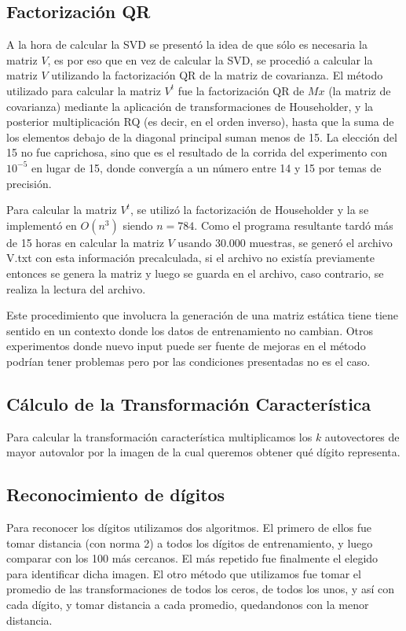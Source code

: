 \subsection{Factorizaci\'on QR}
A la hora de calcular la SVD se present\'o la idea de que s\'olo es necesaria la matriz $V$, es por
eso que en vez de calcular la SVD, se procedi\'o a calcular la matriz $V$ utilizando la factorizaci\'on
QR de la matriz de covarianza. El m\'etodo utilizado para calcular la matriz $V^t$ fue la factorizaci\'on
QR de $Mx$ (la matriz de covarianza) mediante la aplicaci\'on de transformaciones de Householder, y la
posterior multiplicaci\'on RQ (es decir, en el orden inverso), hasta que la suma de los elementos debajo
de la diagonal principal suman menos de 15. La elecci\'on del 15 no fue caprichosa, sino que es el
resultado de la corrida del experimento con $10^{-5}$ en lugar de 15, donde converg\'ia a un n\'umero
entre 14 y 15 por temas de precisi\'on.

Para calcular la matriz $V^t$, se utiliz\'o la factorizaci\'on de Householder y la se implement\'o en $O(n^3)$
siendo $n = 784$. Como el programa resultante tard\'o m\'as de 15 horas en calcular la matriz $V$ usando 30.000 muestras,
se gener\'o el archivo V.txt con esta informaci\'on precalculada, si el archivo no exist\'ia previamente
entonces se genera la matriz y luego se guarda en el archivo, caso contrario, se realiza la lectura del archivo.

Este procedimiento que involucra la generaci\'on de una matriz est\'atica tiene tiene sentido en un contexto
donde los datos de entrenamiento no cambian. Otros experimentos donde nuevo input puede ser fuente de mejoras
en el m\'etodo podr\'ian tener problemas pero por las condiciones presentadas no es el caso.

\subsection{C\'alculo de la Transformaci\'on Caracter\'istica}
Para calcular la transformaci\'on caracter\'istica multiplicamos los $k$ autovectores de mayor autovalor por
la imagen de la cual queremos obtener qu\'e d\'igito representa.



\subsection{Reconocimiento de d\'igitos}
Para reconocer los d\'igitos utilizamos dos algoritmos. El primero de ellos fue tomar distancia (con norma 2) a
todos los d\'igitos de entrenamiento, y luego comparar con los 100 m\'as cercanos. El m\'as repetido fue finalmente
el elegido para identificar dicha imagen. El otro m\'etodo que utilizamos fue tomar el promedio de las transformaciones
de todos los ceros, de todos los unos, y as\'i con cada d\'igito, y tomar distancia a cada promedio, quedandonos con la
menor distancia.
